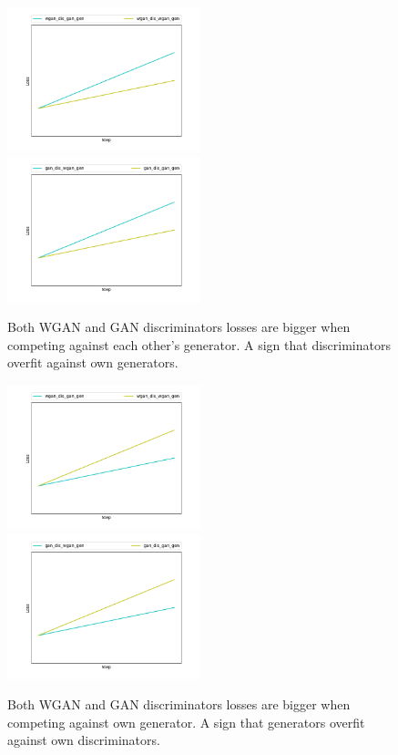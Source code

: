 	\begin{figure}[h] 
		\includegraphics[width=0.5\textwidth]{figures/dis_overfit_wgan_dis_gan_gen}
		\includegraphics[width=0.5\textwidth]{figures/dis_overfit_gan_dis_wgan_gen}
		\caption{Both WGAN and GAN discriminators losses are bigger when competing against each other's generator. A sign that discriminators overfit against own generators.}
		\label{fig:cd_dis_overfit}	
	\end{figure}
	\begin{figure}[h] 
		\includegraphics[width=0.5\textwidth]{figures/gen_overfit_wgan_dis_gan_gen}
		\includegraphics[width=0.5\textwidth]{figures/gen_overfit_gan_dis_wgan_gen}
		\caption{Both WGAN and GAN discriminators losses are bigger when competing against own generator. A sign that generators overfit against own discriminators.}
		\label{fig:cd_gen_overfit}
	\end{figure}

